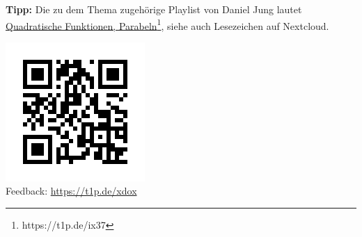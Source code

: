 \documentclass[a4paper,ngerman,12pt]{exam}
\begin{document}
\par \textbf{Tipp:} Die zu dem Thema zugehörige Playlist von Daniel Jung lautet \href{https://t1p.de/ix37}{Quadratische Funktionen, Parabeln\footnote{\url{https://t1p.de/ix37}}}, siehe auch Lesezeichen auf Nextcloud.

\includegraphics[scale=0.4]{qr-code-t1p-de-xdox}\\
Feedback: \href{https://t1p.de/xdox}{https://t1p.de/xdox}

%
\end{document}
